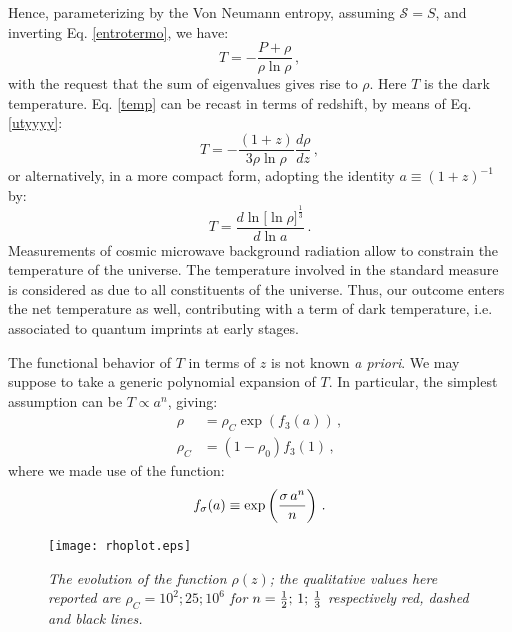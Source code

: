 \documentclass[nofootinbib,prd,superscriptaddress,showpacs,showkeys,]{revtex4}
\begin{document}
Hence, parameterizing by the Von Neumann entropy,   assuming  $\mathcal S=S$,  and inverting Eq. \eqref{entrotermo}, we have:
\begin{equation}\label{temp}
T=-\frac{P+\rho}{\rho\ln\rho}\,,
\end{equation}
with the request that the sum of eigenvalues gives rise to $\rho$. Here $T$ is the dark temperature. Eq. \eqref{temp} can be recast in terms of  redshift, by means of Eq. \eqref{utyyyy}:
\begin{equation}\label{tempz}
T=-\frac{(1+z)}{3\rho\ln\rho}\frac{d\rho}{dz}\,,
\end{equation}
or alternatively, in a more compact form, adopting the identity $a\equiv(1+z)^{-1}$ by:
\begin{equation}\label{tempcompact}
\boxed{T=\frac{d\ln\Big[\ln\rho\Big]^{\frac{1}{3}}}{d\ln a}\,.}
\end{equation}
Measurements of cosmic microwave background radiation allow to constrain the temperature of the universe. The temperature involved in the standard measure is considered as due to all constituents of the universe. Thus, our outcome enters the net temperature as well, contributing with a term of dark temperature, i.e. associated to quantum imprints at early stages.

The functional behavior of $T$ in terms of $z$ is not known \emph{a priori}. We may suppose to take a generic polynomial expansion of $T$. In particular, the simplest assumption can be $T\propto a^n$, giving:
\begin{subequations}
\label{soluz}
\begin{align}
\rho&=\rho_C \exp(f_3(a))\,,\\
\rho_C&=(1-\rho_0)f_3(1)\,,
\end{align}
\end{subequations}
where we made use of the function:
\begin{equation}\label{f}
f_\sigma(a)\equiv\exp\left({\sigma\,a^n\over n}\right)\,.
\end{equation}

\begin{figure}[ht]
\texttt{[image: rhoplot.eps]}
\caption{{\it{The evolution of the function $\rho(z)$; the qualitative values here reported are $\rho_C=10^2; 25; 10^6$ for $n={1\over 2};\,1;\,{1\over 3}$ respectively red, dashed and black lines. }}}
\label{figura2}
\end{figure}
\end{document}
